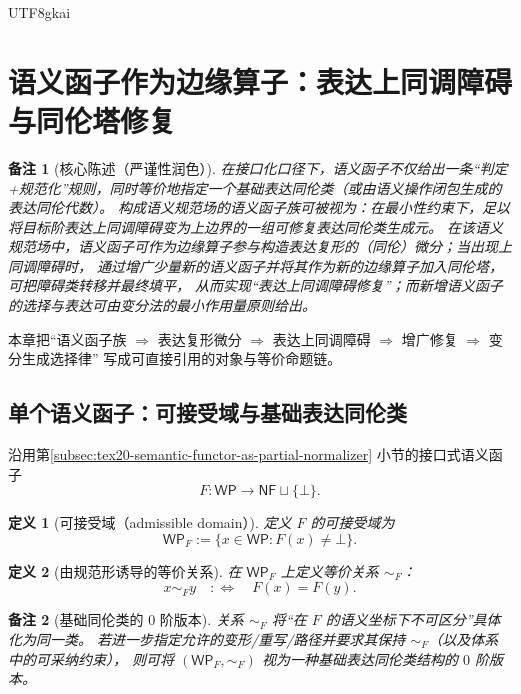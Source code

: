 \documentclass[12pt]{article}
\newtheorem{definition}{定义}[section]
\newtheorem{remark}{备注}[section]
\begin{document}
\begin{CJK*}{UTF8}{gkai}
\clearpage

\section{语义函子作为边缘算子：表达上同调障碍与同伦塔修复}

\begin{remark}[核心陈述（严谨性润色）]
在接口化口径下，语义函子不仅给出一条“判定+规范化”规则，同时等价地指定一个基础表达同伦类（或由语义操作闭包生成的表达同伦代数）。
构成语义规范场的语义函子族可被视为：在最小性约束下，足以将目标阶表达上同调障碍变为上边界的一组可修复表达同伦类生成元。
在该语义规范场中，语义函子可作为边缘算子参与构造表达复形的（同伦）微分；当出现上同调障碍时，
通过增广少量新的语义函子并将其作为新的边缘算子加入同伦塔，可把障碍类转移并最终填平，
从而实现“表达上同调障碍修复”；而新增语义函子的选择与表达可由变分法的最小作用量原则给出。\cite{EdgeOperatorTowerTex17,AxiomSemanticsWorkflowTex18,BV1981}
\end{remark}

本章把“语义函子族 $\Rightarrow$ 表达复形微分 $\Rightarrow$ 表达上同调障碍 $\Rightarrow$ 增广修复 $\Rightarrow$ 变分生成选择律”
写成可直接引用的对象与等价命题链。

\subsection{单个语义函子：可接受域与基础表达同伦类}
\label{subsec:tex20-ch2-single-functor}

沿用第\ref{subsec:tex20-semantic-functor-as-partial-normalizer} 小节的接口式语义函子
\[
F:\mathsf{WP}\to \mathsf{NF}\sqcup \{\bot\}.
\]

\begin{definition}[可接受域（admissible domain）]
定义 $F$ 的可接受域为
\[
\mathsf{WP}_F:=\{x\in\mathsf{WP}:F(x)\neq \bot\}.
\]
\end{definition}

\begin{definition}[由规范形诱导的等价关系]
在 $\mathsf{WP}_F$ 上定义等价关系 $\sim_F$：
\[
x\sim_F y\quad:\Longleftrightarrow\quad F(x)=F(y).
\]
\end{definition}

\begin{remark}[基础同伦类的 $0$ 阶版本]
关系 $\sim_F$ 将“在 $F$ 的语义坐标下不可区分”具体化为同一类。
若进一步指定允许的变形/重写/路径并要求其保持 $\sim_F$（以及体系中的可采纳约束），
则可将 $(\mathsf{WP}_F,\sim_F)$ 视为一种基础表达同伦类结构的 $0$ 阶版本。
\end{remark}


\end{CJK*}
\end{document}
